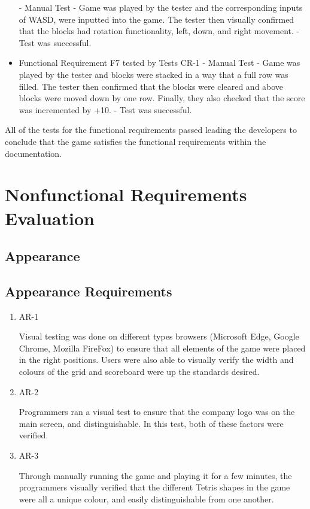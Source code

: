 \documentclass[12pt, titlepage]{article}
\begin{document}
\begin{itemize}
    \subitem - Manual Test
    \subitem - Game was played by the tester and the corresponding inputs of WASD, were inputted into the game. The tester then visually confirmed that the blocks had rotation functionality, left, down, and right movement.
    \subitem - Test was successful.
    \item Functional Requirement F7 tested by Tests CR-1
    \subitem - Manual Test
    \subitem - Game was played by the tester and blocks were stacked in a way that a full row was filled. The tester then confirmed that the blocks were cleared and above blocks were moved down by one row. Finally, they also checked that the score was incremented by +10.
    \subitem - Test was successful.
\end{itemize}

All of the tests for the functional requirements passed leading the developers to conclude that the game satisfies the functional requirements within the documentation. 

\section{Nonfunctional Requirements Evaluation}

\subsection{Appearance}

\subsection{Appearance Requirements}

\begin{enumerate}

\item{AR-1\\}

Visual testing was done on different types browsers (Microsoft Edge, Google Chrome, Mozilla FireFox) to ensure that all elements of the game were placed in the right positions. Users were also able to visually verify the width and colours of the grid and scoreboard were up the standards desired.
					
\item{AR-2\\}

Programmers ran a visual test to ensure that the company logo was on the main screen, and distinguishable. In this test, both of these factors were verified.


\item{AR-3\\}

Through manually running the game and playing it for a few minutes, the programmers visually verified that the different Tetris shapes in the game were all a unique colour, and easily distinguishable from one another.

\end{enumerate}
\end{document}
